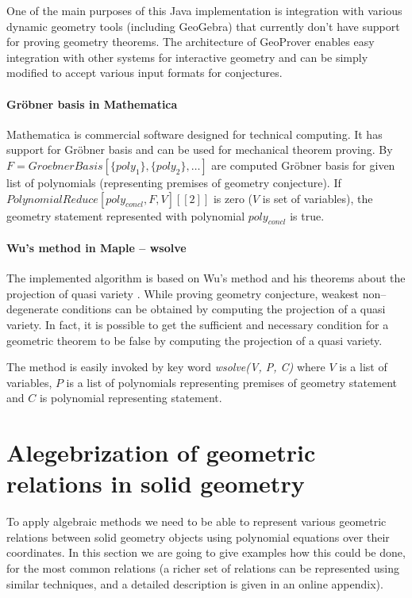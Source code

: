 \documentclass[final,1p,times,authoryear]{elsarticle}
\begin{document}
One of the main purposes of this Java implementation is integration
with various dynamic geometry tools (including GeoGebra) that
currently don't have support for proving geometry theorems. The
architecture of GeoProver enables easy integration with other systems
for interactive geometry and can be simply modified to accept various
input formats for conjectures.

\paragraph{Gr\"obner basis in Mathematica}

Mathematica is commercial software designed for technical
computing. It has support for Gr\"obner basis and can be used for
mechanical theorem proving. By $F = GroebnerBasis[\{poly_1\}, \{poly_2\},
  \ldots]$ are computed Gr\"obner basis for given list of polynomials
(representing premises of geometry conjecture). If
$PolynomialReduce[poly_{concl}, F, V][[2]]$ is zero ($V$ is set of
  variables), the geometry statement represented with polynomial
  $poly_{concl}$ is true.

\paragraph{Wu's method in Maple -- wsolve}

The implemented algorithm is based on Wu's method and his theorems
about the projection of quasi variety \cite{quasivarieties}. While
proving geometry conjecture, weakest non--degenerate conditions can be
obtained by computing the projection of a quasi variety. In fact, it
is possible to get the sufficient and necessary condition for a
geometric theorem to be false by computing the projection of a quasi
variety.

The method is easily invoked by key word \emph{wsolve(V, P, C)} where
$V$ is a list of variables, $P$ is a list of polynomials representing
premises of geometry statement and $C$ is polynomial representing
statement.


\section{Alegebrization of geometric relations in solid geometry}
\label{polynomials}
To apply algebraic methods we need to be able to represent various
geometric relations between solid geometry objects using polynomial
equations over their coordinates. In this section we are going to give
examples how this could be done, for the most common relations (a
richer set of relations can be represented using similar techniques,
and a detailed description is given in an online
appendix). %
\end{document}
